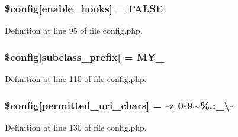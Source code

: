 \subsubsection[{\texorpdfstring{\$config}{$config}}]{\setlength{\rightskip}{0pt plus 5cm}\$config\mbox{[}\textquotesingle{}enable\+\_\+hooks\textquotesingle{}\mbox{]} = F\+A\+L\+SE}\hypertarget{ci_2application_2config_2config_8php_a2d80c3b160b2bb6f3329a9b07e970c51}{}\label{ci_2application_2config_2config_8php_a2d80c3b160b2bb6f3329a9b07e970c51}


Definition at line 95 of file config.\+php.

\subsubsection[{\texorpdfstring{\$config}{$config}}]{\setlength{\rightskip}{0pt plus 5cm}\$config\mbox{[}\textquotesingle{}subclass\+\_\+prefix\textquotesingle{}\mbox{]} = \textquotesingle{}M\+Y\+\_\+\textquotesingle{}}\hypertarget{ci_2application_2config_2config_8php_a51b79c9e455d64cb54212f2966b28ae6}{}\label{ci_2application_2config_2config_8php_a51b79c9e455d64cb54212f2966b28ae6}


Definition at line 110 of file config.\+php.

\subsubsection[{\texorpdfstring{\$config}{$config}}]{\setlength{\rightskip}{0pt plus 5cm}\$config\mbox{[}\textquotesingle{}permitted\+\_\+uri\+\_\+chars\textquotesingle{}\mbox{]} = -\/{\bf z} 0-\/9$\sim$\%.\+:\+\_\+\textbackslash{}-\/\textquotesingle{}}\hypertarget{ci_2application_2config_2config_8php_ae2e36375b245287a8851ac04565994de}{}\label{ci_2application_2config_2config_8php_ae2e36375b245287a8851ac04565994de}


Definition at line 130 of file config.\+php.

